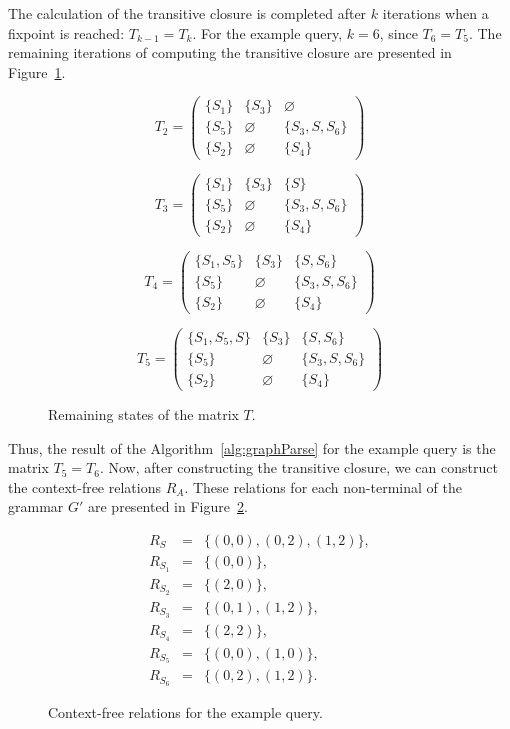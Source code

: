 \documentclass[runningheads,a4paper]{llncs}
\begin{document}
The calculation of the transitive closure is completed after $k$ iterations when a fixpoint is reached: $T_{k-1} = T_k$. For the example query, $k = 6$, since $T_6 = T_5$. The remaining iterations of computing the transitive closure are presented in Figure~\ref{ExampleQueryFinalIterations}.

\begin{figure}[h]
	\[
	T_2 = \begin{pmatrix}
	\{S_1\} & \{S_3\} & \varnothing \\ \{S_5\} & \varnothing & \{S_3, S, S_6\} \\ \{S_2\} & \varnothing & \{S_4\}
	\end{pmatrix}
	\]
	
	\[
	T_3 = \begin{pmatrix}
	\{S_1\} & \{S_3\} & \{S\} \\ \{S_5\} & \varnothing & \{S_3, S, S_6\} \\ \{S_2\} & \varnothing & \{S_4\}
	\end{pmatrix}
	\]
	
	\[
	T_4 = \begin{pmatrix}
	\{S_1, S_5\} & \{S_3\} & \{S, S_6\} \\ \{S_5\} & \varnothing & \{S_3, S, S_6\} \\ \{S_2\} & \varnothing & \{S_4\}
	\end{pmatrix}
	\]
	
	\[
	T_5 = \begin{pmatrix}
	\{S_1, S_5, S\} & \{S_3\} & \{S, S_6\} \\ \{S_5\} & \varnothing & \{S_3, S, S_6\} \\ \{S_2\} & \varnothing & \{S_4\}
	\end{pmatrix}
	\]
	\caption{Remaining states of the matrix $T$.}
	\label{ExampleQueryFinalIterations}
\end{figure}

Thus, the result of the Algorithm~\ref{alg:graphParse} for the example query is the matrix $T_5 = T_6$. Now, after constructing the transitive closure, we can construct the context-free relations $R_A$. These relations for each non-terminal of the grammar $G'$ are presented in Figure~\ref{ExampleQueryCFRelations}.

\begin{figure}[h]
	\begin{eqnarray*}
		R_S&=&\{(0,0),(0,2),(1,2)\},\\
		R_{S_1}&=&\{(0,0)\},\\
		R_{S_2}&=&\{(2,0)\}, \\
		R_{S_3}&=&\{(0,1), (1,2)\}, \\
		R_{S_4}&=&\{(2,2)\}, \\
		R_{S_5}&=&\{(0,0), (1,0)\}, \\
		R_{S_6}&=&\{(0,2), (1,2)\}.
	\end{eqnarray*}
	\caption{Context-free relations for the example query.}
	\label{ExampleQueryCFRelations}
\end{figure}
\end{document}

